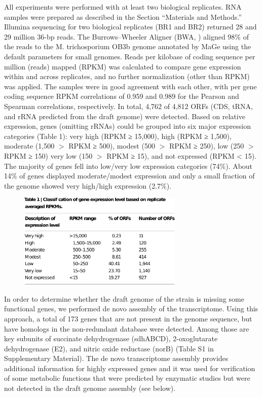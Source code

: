 All experiments were performed with at least two biological replicates.
RNA samples were prepared as described in the Section “Materials and Methods.”
Illumina sequencing for two biological replicates (BR1 and BR2) returned 28 and 29 million 36-bp reads.
The Burrows–Wheeler Aligner (BWA, \cite{li2009}) aligned 98\% of the reads to the M. trichosporium OB3b genome annotated by MaGe \cite{vallenet2006} using the default parameters for small genomes.
Reads per kilobase of coding sequence per million (reads) mapped (RPKM) \cite{mortazavi2008} was calculated to compare gene expression within and across replicates, and no further normalization (other than RPKM) was applied.
The samples were in good agreement with each other, with per gene coding sequence RPKM correlations of 0.959 and 0.989 for the Pearson and Spearman correlations, respectively.
In total, 4,762 of 4,812 ORFs (CDS, tRNA, and rRNA predicted from the draft genome) were detected.
Based on relative expression, genes (omitting rRNAs) could be grouped into six major expression categories (Table 1): very high (RPKM ≥ 15,000), high (RPKM ≥ 1,500), moderate (1,500 $>$ RPKM ≥ 500), modest (500 $>$ RPKM ≥ 250), low (250 $>$ RPKM ≥ 150) very low (150 $>$ RPKM ≥ 15), and not expressed (RPKM < 15).
The majority of genes fell into low/very low expression categories (74\%).
About 14\% of genes displayed moderate/modest expression and only a small fraction of the genome showed very high/high expression (2.7\%).

\begin{figure}[H]
\centering
     \includegraphics[width=0.7\textwidth]{./tex/chapter1/figures/matsen_OB3b_table1_page--cropped.pdf}
     \begin{singlespace}
     \label{table:OB3b_1}
     \end{singlespace}
\end{figure}

In order to determine whether the draft genome of the strain is missing some functional genes, we performed de novo assembly of the transcriptome.
Using this approach, a total of 173 genes that are not present in the genome sequence, but have homologs in the non-redundant database were detected.
Among those are key subunits of succinate dehydrogenase (sdhABCD), 2-oxoglutarate dehydrogenase (E2), and nitric oxide reductase (norB) (Table S1 in Supplementary Material).
The de novo transcriptome assembly provides additional information for highly expressed genes and it was used for verification of some metabolic functions that were predicted by enzymatic studies but were not detected in the draft genome assembly (see below).


